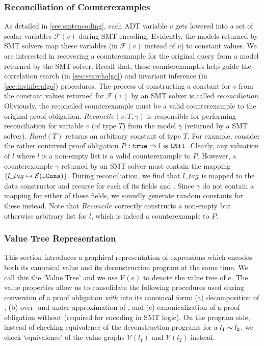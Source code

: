 \subsubsection{Reconciliation of Counterexamples}
\label{sec:cerecons}
As detailed in \cref{sec:smtencoding}, each ADT variable $v$ gets lowered into a set of scalar
variables $\mathcal{F}(v)$ during SMT encoding.
Evidently, the models returned by SMT solvers map these variables (in $\mathcal{F}(v)$ instead of $v$)
to constant values.
We are interested in recovering a counterexample for the original query from a
model returned by the SMT solver.
Recall that, these counterexamples help guide the correlation search (in \cref{sec:searchalgo})
and invariant inference (in \cref{sec:invinferalgo}) procedures.
The process of constructing a constant for $v$ from the constant values returned for $\mathcal{F}(v)$
by an SMT solver is called {\em reconciliation}.
Obviously, the reconciled counterexample must be a valid counterexample to the original proof obligation.
$Reconcile(v:T, \gamma)$ is responsible for performing reconciliation for variable $v$ (of type $T$)
from the model $\gamma$ (returned by a SMT solver).
$Rand(T)$ returns an arbitrary constant of type $T$.
For example, consider the rather contrived proof obligation $P: {\tt true} \Rightarrow l\ \mathrm{is}\ {\tt {\tt LNil}}$.
Clearly, any valuation of $l$ where $l$ is a non-empty list is a valid counterexample to $P$.
However, a counterexample $\gamma$ returned by an SMT solver must contain
the mapping $\{ l \strsep{} tag \mapsto \mathcal{E}(\cons{LCons}) \}$.
During reconciliation, we find that $l \strsep{} tag$ is mapped to the data constructor 
and recurse for each of its fields  and .
Since $\gamma$ do not contain a mapping for either of these fields, we soundly generate random constants
for these instead.
Note that $Reconcile$ correctly constructs a non-empty but otherwise arbitrary list for $l$, which
is indeed a counterexample to $P$.



\subsubsection{Value Tree Representation}
\label{sec:valuegraph}
This section introduces a graphical representation of expressions which encodes both its canonical value and
its deconstruction program at the same time.
We call this the `Value Tree' and we use $\mathcal{V}(e)$ to denote the value tree of $e$.
The value properties allow us to consolidate the following procedures used during conversion of a proof obligation
{\em with} \recursiveRelations{} into its canonical form:
(a) decomposition of \recursiveRelations{}, (b) over- and under-approximation of \recursiveRelations{},
and (c) canonicalization of a proof obligation without \recursiveRelations{} (required for encoding in SMT logic).
On the program side, instead of checking equivalence of the deconstruction programs for a \recursiveRelation{} $l_1 \sim{} l_2$,
we check `equivalence' of the value graphs $\mathcal{V}(l_1)$ and $\mathcal{V}(l_2)$ instead.

